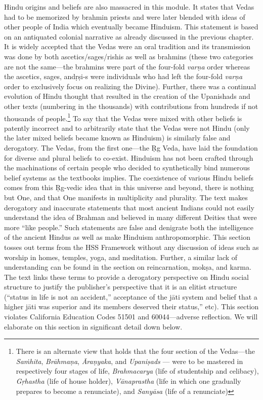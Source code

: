 Hindu origins and beliefs are also massacred in this module. It states that Vedas had to be memorized by brahmin priests and were later blended with ideas of other people of India which eventually became Hinduism. This statement is based on an antiquated colonial narrative as already discussed in the previous chapter. It is widely accepted that the Vedas were an oral tradition and its transmission was done by both ascetics/sages/rishis as well as brahmins (these two categories are not the same—the brahmins were part of the four-fold \textit{varṇa}  order whereas the ascetics, sages, and\break ṛṣi-s were individuals who had left the four-fold \textit{varṇa}  order to exclusively focus on realizing the Divine). Further, there was a continual evolution of Hindu thought that resulted in the creation of the Upanishads and other texts (numbering in the thousands) with contributions from hundreds if not thousands of people.\footnote{There is an alternate view that holds that the four section of the Vedas—the \textit{Saṁhita}, \textit{Brāhmaṇa}, \textit{Āraṇyaka}, and \textit{Upaniṣads} — were to be mastered in respectively four stages of life, \textit{Brahmacarya} (life of studentship and celibacy), \textit{Gṛhastha} (life of house holder), \textit{Vānaprastha} (life in which one gradually prepares to become a renunciate), and \textit{Sanyāsa} (life of a renunciate)} To say that the Vedas were mixed with other beliefs is patently incorrect and to arbitrarily state that the Vedas were not Hindu (only the later mixed beliefs became known as Hinduism) is similarly false and derogatory. The Vedas, from the first one—the Ṛg Veda, have laid the foundation for diverse and plural beliefs to co-exist. Hinduism has not been crafted through the machinations of certain people who decided to synthetically bind numerous belief systems as the textbooks implies. The coexistence of various Hindu beliefs comes from this Ṛg-vedic idea that in this universe and beyond, there is nothing but One, and that One manifests in multiplicity and plurality. The text makes derogatory and inaccurate statements that most ancient Indians could not easily understand the idea of Brahman and believed in many different Deities that were more “like people.” Such statements are false and denigrate both the intelligence of the ancient Hindus as well as make Hinduism anthropomorphic. This section tosses out terms from the HSS Framework without any discussion of ideas such as worship in homes, temples, yoga, and meditation. Further, a similar lack of understanding can be found in the section on reincarnation, mokṣa, and karma. The text links these terms to provide a derogatory perspective on Hindu social structure to justify the publisher’s perspective that it is an elitist structure (“status in life is not an accident,” acceptance of the jāti system and belief that a higher jāti was superior and its members deserved their status,” etc). This section violates California Education Codes 51501 and 60044—adverse reflection. We will elaborate on this section in significant detail down below.  

